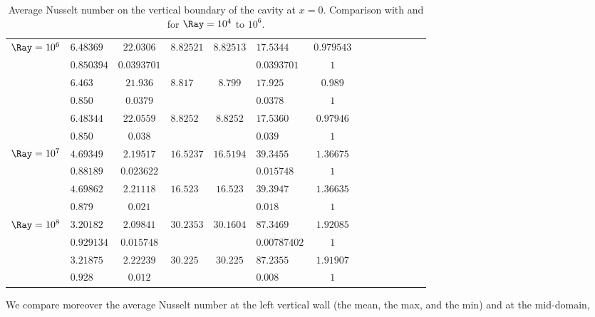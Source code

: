 \begin{table}
\begin{center}
\begin{tabular}{*{7}{cl}}
          \multirow{2}{*}{$\Ray = 10^6$} & $6.48369$ & $22.0306$ & \multirow{2}{*}{$8.82521$} & \multirow{2}{*}{$8.82513 $} & $17.5344$ & $0.979543$  \\
          & $0.850394$ & $0.0393701$ & & & $0.0393701$ & $1$ \\ 
          \multirow{2}{*}{\cite{de1983natural}} & $6.463$ & $21.936 $ & \multirow{2}{*}{$8.817$} & \multirow{2}{*}{$8.799 $} & $17.925$ & $0.989$  \\
          & $0.850$ & $0.0379$ & & & $0.0378$ & $1$ \\
          \multirow{2}{*}{\cite{LeQuere91}} & $6.48344$ & $22.0559 $ & \multirow{2}{*}{$8.8252$} & \multirow{2}{*}{$8.8252 $} & $17.5360$ & $0.97946$  \\
          & $0.850$ & $0.038$ & & & $0.039$ & $1$ \\ \hline
          
          \multirow{2}{*}{$\Ray = 10^7$} & $4.69349$ & $2.19517$ & \multirow{2}{*}{$16.5237$} & \multirow{2}{*}{$16.5194 $} & $39.3455$ & $1.36675$  \\
          & $0.88189$ & $0.023622$ & & & $0.015748$ & $1$ \\ 
          \multirow{2}{*}{\cite{LeQuere91}} & $4.69862$ & $2.21118 $ & \multirow{2}{*}{$16.523$} & \multirow{2}{*}{$16.523 $} & $39.3947$ & $1.36635$  \\
          & $0.879$ & $0.021$ & & & $0.018$ & $1$ \\ \hline

          \multirow{2}{*}{$\Ray = 10^8$} & $3.20182$ & $2.09841$ & \multirow{2}{*}{$30.2353$} & \multirow{2}{*}{$30.1604 $} & $87.3469$ & $1.92085$  \\
          & $0.929134$ & $0.015748$ & & & $0.00787402$ & $1$ \\ 
          \multirow{2}{*}{\cite{LeQuere91}} & $3.21875$ & $2.22239 $ & \multirow{2}{*}{$30.225$} & \multirow{2}{*}{$30.225 $} & $87.2355$ & $1.91907$  \\
          & $0.928$ & $0.012$ & & & $0.008$ & $1$ \\ \bottomrule
          
               \end{tabular}
   \end{center}
   \caption{Average Nusselt number on the vertical boundary of the cavity at $x=0$. Comparison with \cite{de1983natural} and \cite{LeQuere91} for $\Ray= 10^4$ to $10^6$.}
   \label{tab-Nu-natconv}
\end{table}
We compare moreover the average Nusselt number at the left vertical wall (the mean, the max, and the min) and at the mid-domain, 
